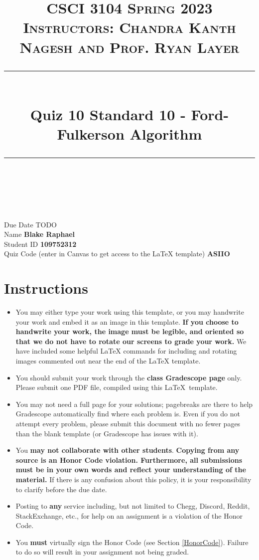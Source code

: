 \documentclass[11pt]{article}
\title{
\normalfont \normalsize 
\textsc{CSCI 3104 Spring 2023 \\ 
Instructors: Chandra Kanth Nagesh and  Prof. Ryan Layer} \\
[10pt] 
\rule{\linewidth}{0.5pt} \\[6pt] 
\huge Quiz 10 Standard 10 - Ford-Fulkerson Algorithm \\
\rule{\linewidth}{2pt}  \\[10pt]
}
\date{}
\theoremstyle{definition}
\theoremstyle{definition}
\theoremstyle{definition}
\begin{document}

\maketitle


\noindent
Due Date \dotfill TODO \\
Name \dotfill \textbf{Blake Raphael} \\
Student ID \dotfill \textbf{109752312} \\
Quiz Code (enter in Canvas to get access to the LaTeX template) \dotfill \textbf{ASIIO}


\tableofcontents

\section*{Instructions}
 \begin{itemize}
	\item You may either type your work using this template, or you may handwrite your work and embed it as an image in this template. \textbf{If you choose to handwrite your work, the image must be legible, and oriented so that we do not have to rotate our screens to grade your work.} We have included some helpful LaTeX commands for including and rotating images commented out near the end of the LaTeX template.
	\item You should submit your work through the \textbf{class Gradescope page} only. Please submit one PDF file, compiled using this \LaTeX \ template.
	\item You may not need a full page for your solutions; pagebreaks are there to help Gradescope automatically find where each problem is. Even if you do not attempt every problem, please submit this document with no fewer pages than the blank template (or Gradescope has issues with it).

	\item You \textbf{may not collaborate with other students}. \textbf{Copying from any source is an Honor Code violation. Furthermore, all submissions must be in your own words and reflect your understanding of the material.} If there is any confusion about this policy, it is your responsibility to clarify before the due date. 

	\item Posting to \textbf{any} service including, but not limited to Chegg, Discord, Reddit, StackExchange, etc., for help on an assignment is a violation of the Honor Code.

	\item You \textbf{must} virtually sign the Honor Code (see Section \ref{HonorCode}). Failure to do so will result in your assignment not being graded.
\end{itemize}
\end{document}
